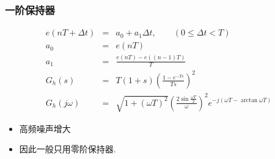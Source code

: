\documentclass[table]{beamer}
\begin{document}
\begin{frame}
\frametitle{一阶保持器}
\label{sec-3-4}

\begin{eqnarray*}
 e(nT+\Delta t) &=& a_0+a_1 \Delta t, \qquad (0\leq \Delta t < T) \\
 a_0& = & e(nT) \\
 a_1&=& \frac{e(nT)-e((n-1)T)}{T} \\
G_h(s) &=& T(1+s)\left(\frac{1-e^{-Ts}}{Ts}\right)^2 \\
G_h(j\omega) &=& \sqrt{1+(\omega T)^2}\left(\frac{2\sin\frac{\omega T}{2}}{\omega }\right)^2e^{-j(\omega T-\arctan\omega T)}
\end{eqnarray*}

\begin{itemize}
\item <2-> 高频噪声增大
\item <3-> 因此一般只用零阶保持器.
\end{itemize}
\end{frame}
\end{document}
